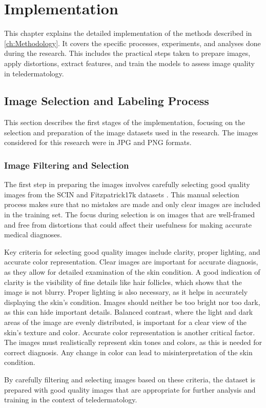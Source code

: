 \chapter{Implementation}
\label{ch:Implementation}
This chapter explains the detailed implementation of the methods described in \autoref{ch:Methodology}. It covers the specific processes, experiments, and analyses done during the research. This includes the practical steps taken to prepare images, apply distortions, extract features, and train the models to assess image quality in teledermatology. \par

\section{Image Selection and Labeling Process}
\label{sec:ImgSelectLabel}
This section describes the first stages of the implementation, focusing on the selection and preparation of the image datasets used in the research. The images considered for this research were in JPG and PNG formats. \par

\subsection{Image Filtering and Selection}
\label{sub:ImgFilterSelect}
The first step in preparing the images involves carefully selecting good quality images from the SCIN \autocite{SCIN} and Fitzpatrick17k datasets \autocite{F17K}. This manual selection process makes sure that no mistakes are made and only clear images are included in the training set. The focus during selection is on images that are well-framed and free from distortions that could affect their usefulness for making accurate medical diagnoses. \par
\vspace{\baselineskip}
\noindent
Key criteria for selecting good quality images include clarity, proper lighting, and accurate color representation. Clear images are important for accurate diagnosis, as they allow for detailed examination of the skin condition. A good indication of clarity is the visibility of fine details like hair follicles, which shows that the image is not blurry. Proper lighting is also necessary, as it helps in accurately displaying the skin’s condition. Images should neither be too bright nor too dark, as this can hide important details. Balanced contrast, where the light and dark areas of the image are evenly distributed, is important for a clear view of the skin’s texture and color. Accurate color representation is another critical factor. The images must realistically represent skin tones and colors, as this is needed for correct diagnosis. Any change in color can lead to misinterpretation of the skin condition. \par
\vspace{\baselineskip}
\noindent
By carefully filtering and selecting images based on these criteria, the dataset is prepared with good quality images that are appropriate for further analysis and training in the context of teledermatology. \par

